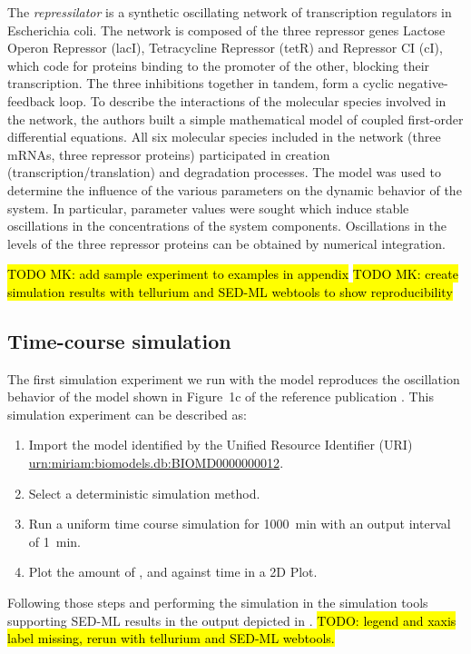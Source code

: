 The \emph{repressilator} is a synthetic oscillating network of transcription regulators in Escherichia coli. The network is composed of the three repressor genes Lactose Operon Repressor (lacI), Tetracycline Repressor (tetR) and Repressor CI (cI), which code for proteins binding to the promoter of the other, blocking their transcription. The three inhibitions together in tandem, form a cyclic negative-feedback loop. To describe the interactions of the molecular species involved in the network, the authors built a simple mathematical model of coupled first-order differential equations. All six molecular species included in the network (three mRNAs, three repressor proteins) participated in creation (transcription/translation) and degradation processes. The model was used to determine the influence of the various parameters on the dynamic behavior of the system. In particular, parameter values were sought which induce stable oscillations in the concentrations of the system components. Oscillations in the levels of the three repressor proteins can be obtained by numerical integration. 

\hl{TODO MK: add sample experiment to examples in appendix}
\hl{TODO MK: create simulation results with tellurium and SED-ML webtools to show reproducibility}

\subsection{Time-course simulation}
\label{sec:timecourse}
The first simulation experiment we run with the model reproduces the oscillation behavior of the model shown in Figure~1c of the reference publication \citep{Elowitz:2000}. This simulation experiment can be described as:

\begin{enumerate}
 	\item{Import the model identified by the Unified Resource Identifier (URI) \citep{Berners-Lee:2005}\\ 	\url{urn:miriam:biomodels.db:BIOMD0000000012}.}
 	\item {Select a deterministic simulation method.}
 	\item{Run a uniform time course simulation for 1000~min with an output interval of 1~min.}
 	\item{Plot the amount of ,  and  against time in a 2D Plot.}
 \end{enumerate}

Following those steps and performing the simulation in the simulation tools supporting SED-ML results in the output depicted in . \hl{TODO: legend and xaxis label missing, rerun with tellurium and SED-ML webtools.}

